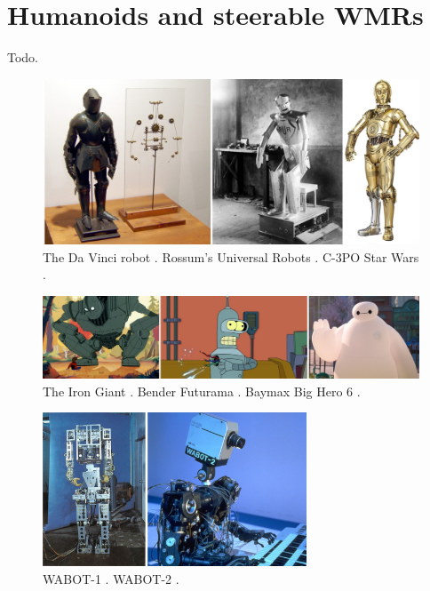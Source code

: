 \chapter{Humanoids and steerable WMRs}
Todo. 

\begin{figure}
    \centering
    \includegraphics[width=\textwidth]{figures/01-introduction/robot-history.jpg}
    \caption{The Da Vinci robot \cite{Moran2006TheDaVinciRobot}.
        Rossum's Universal Robots \cite{Capek1920RUR}.
        C-3PO Star Wars \cite{StarWars1977}.
    }
    \label{fig:introduction:robots-in-history}
\end{figure}

\begin{figure}
    \centering
    \includegraphics[width=\textwidth]{figures/01-introduction/robots-in-animation.jpg}
    \caption{The Iron Giant \cite{TheIronGiant1999}.
        Bender Futurama \cite{Futurama1999}.
        Baymax Big Hero 6 \cite{BigHero62014}.
    }
    \label{fig:introduction:robots-in-animation}
\end{figure}

\begin{figure}
    \centering
    \includegraphics[width=0.7\textwidth]{figures/01-introduction/WABOTs.jpg}
    \caption{WABOT-1 \cite{Kato1973TheWABOT1}. WABOT-2 \cite{Kato1987WABOT2}.}
    \label{fig:introduction:WABOTs}
\end{figure}

